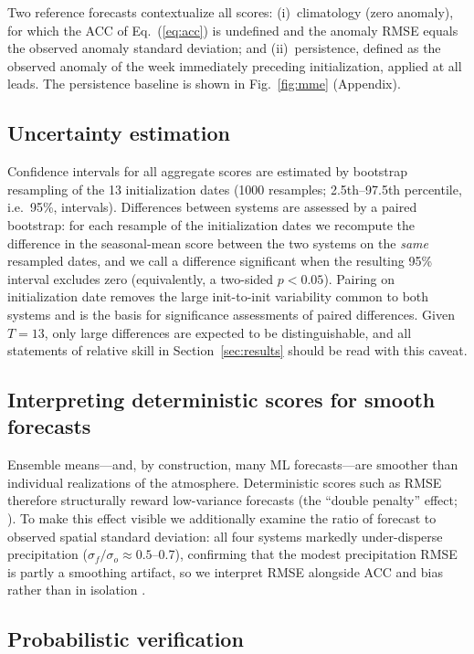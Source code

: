 \documentclass[11pt]{article}
\begin{document}
Two reference forecasts contextualize all scores: (i)~climatology
(zero anomaly), for which the ACC of Eq.~(\ref{eq:acc}) is undefined
and the anomaly RMSE equals the observed anomaly standard deviation;
and (ii)~persistence, defined as the observed anomaly of the week
immediately preceding initialization, applied at all leads.
The persistence baseline is shown in Fig.~\ref{fig:mme} (Appendix).

\subsection{Uncertainty estimation}\label{sec:uncertainty}

Confidence intervals for all aggregate scores are estimated by
bootstrap resampling of the 13 initialization dates (1000 resamples;
2.5th--97.5th percentile, i.e.\ 95\%, intervals). Differences between
systems are assessed by a paired bootstrap: for each resample of the
initialization dates we recompute the difference in the seasonal-mean
score between the two systems on the \emph{same} resampled dates, and we
call a difference significant when the resulting 95\% interval excludes
zero (equivalently, a two-sided $p<0.05$). Pairing on initialization date
removes the large init-to-init variability common to both systems and is
the basis for significance assessments of paired differences. Given
$T=13$, only large differences are expected to be distinguishable, and
all statements of relative skill in Section~\ref{sec:results} should be
read with this caveat.

\subsection{Interpreting deterministic scores for smooth forecasts}
\label{sec:smoothing}

Ensemble means---and, by construction, many ML forecasts---are
smoother than individual realizations of the atmosphere. Deterministic
scores such as RMSE therefore structurally reward low-variance
forecasts (the ``double penalty'' effect;
\citealp{wilks2019,benbouallegue2024}). To make this effect visible we
additionally examine the ratio of forecast to observed spatial standard
deviation: all four systems markedly under-disperse precipitation
($\sigma_f/\sigma_o\approx0.5$--0.7), confirming that the modest
precipitation RMSE is partly a smoothing artifact, so we interpret RMSE
alongside ACC and bias rather than in isolation \citep{murphy1988}.

\subsection{Probabilistic verification}\label{sec:prob_methods}
\end{document}
